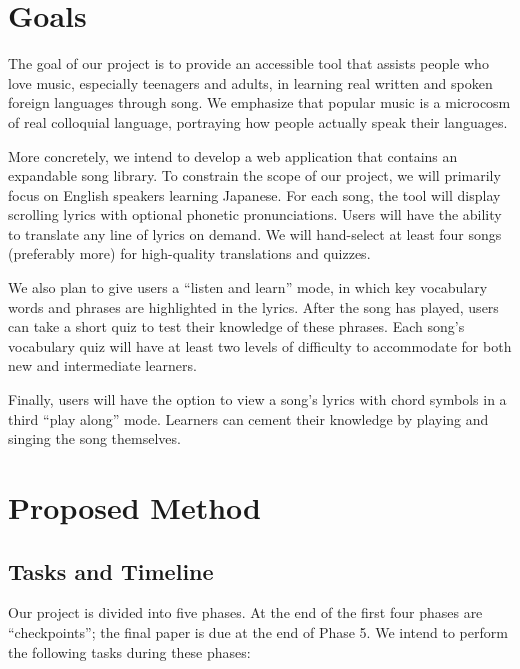 \documentclass[conference, 12pt]{IEEEtran}
\begin{document}
\section{Goals}
The goal of our project is to provide an accessible tool that assists people who love music, especially teenagers and adults, in learning real written and spoken foreign languages through song. 
We emphasize that popular music is a microcosm of real colloquial language, portraying how people actually speak their languages.

More concretely, we intend to develop a web application that contains an expandable song library. 
To constrain the scope of our project, we will primarily focus on English speakers learning Japanese. 
For each song, the tool will display scrolling lyrics with optional phonetic pronunciations. Users will have the ability to translate any line of lyrics on demand. 
We will hand-select at least four songs (preferably more) for high-quality translations and quizzes.

We also plan to give users a ``listen and learn'' mode, in which key vocabulary words and phrases are highlighted in the lyrics. 
After the song has played, users can take a short quiz to test their knowledge of these phrases. 
Each song's vocabulary quiz will have at least two levels of difficulty to accommodate for both new and intermediate learners.

Finally, users will have the option to view a song's lyrics with chord symbols in a third ``play along'' mode. 
Learners can cement their knowledge by playing and singing the song themselves.

\section{Proposed Method}
\subsection{Tasks and Timeline}
Our project is divided into five phases. At the end of the first four phases are ``checkpoints''; the final paper is due at the end of Phase 5. We intend to perform the following tasks during these phases:
\end{document}
